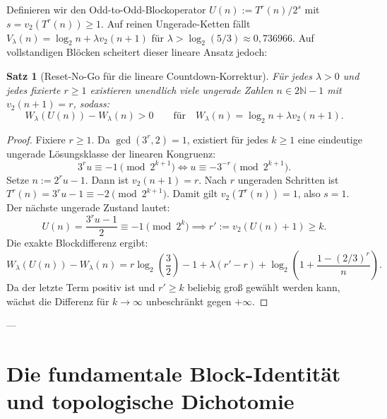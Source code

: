\documentclass[11pt,reqno]{amsart}
\newtheorem{theorem}{Satz}[section]
\theoremstyle{definition}
\theoremstyle{remark}
\numberwithin{equation}{section}
\begin{document}
Definieren wir den Odd-to-Odd-Blockoperator $U(n) := T^r(n) / 2^s$ mit $s = v_2(T^r(n)) \ge 1$. Auf reinen Ungerade-Ketten f\"allt $V_\lambda(n) = \log_2 n + \lambda v_2(n+1)$ f\"ur $\lambda > \log_2(5/3) \approx 0{,}736966$. Auf vollstandigen Blöcken scheitert dieser lineare Ansatz jedoch:

\begin{theorem}[Reset-No-Go f\"ur die lineare Countdown-Korrektur]
\label{thm:reset_nogo}
F\"ur jedes $\lambda > 0$ und jedes fixierte $r \ge 1$ existieren unendlich viele ungerade Zahlen $n \in 2\mathbb{N}-1$ mit $v_2(n+1) = r$, sodass:
\begin{equation}
W_\lambda(U(n)) - W_\lambda(n) > 0 \qquad \text{f\"ur} \quad W_\lambda(n) = \log_2 n + \lambda v_2(n+1).
\end{equation}
\end{theorem}

\begin{proof}
Fixiere $r \ge 1$. Da $\gcd(3^r, 2) = 1$, existiert f\"ur jedes $k \ge 1$ eine eindeutige ungerade L\"osungsklasse der linearen Kongruenz:
\begin{equation}
3^r u \equiv -1 \pmod{2^{k+1}} \iff u \equiv -3^{-r} \pmod{2^{k+1}}.
\end{equation}
Setze $n := 2^r u - 1$. Dann ist $v_2(n+1) = r$. Nach $r$ ungeraden Schritten ist $T^r(n) = 3^r u - 1 \equiv -2 \pmod{2^{k+1}}$.
Damit gilt $v_2(T^r(n)) = 1$, also $s = 1$. 
Der n\"achste ungerade Zustand lautet:
\begin{equation}
U(n) = \frac{3^r u - 1}{2} \equiv -1 \pmod{2^k} \implies r' := v_2(U(n) + 1) \ge k.
\end{equation}
Die exakte Blockdifferenz ergibt:
\begin{equation}
W_\lambda(U(n)) - W_\lambda(n) = r \log_2\left(\frac{3}{2}\right) - 1 + \lambda(r' - r) + \log_2\left(1 + \frac{1 - (2/3)^r}{n}\right).
\end{equation}
Da der letzte Term positiv ist und $r' \ge k$ beliebig gro\ss{} gew\"ahlt werden kann, w\"achst die Differenz f\"ur $k \to \infty$ unbeschr\"ankt gegen $+\infty$.
\end{proof}

---

\section{Die fundamentale Block-Identit\"at und topologische Dichotomie}
\end{document}
